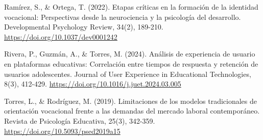 Ramírez, S., \& Ortega, T. (2022). Etapas críticas en la formación de la identidad vocacional: Perspectivas desde la neurociencia y la psicología del desarrollo. Developmental Psychology Review, 34(2), 189-210. \url{https://doi.org/10.1037/dev0001242}
\newline

Rivera, P., Guzmán, A., \& Torres, M. (2024). Análisis de experiencia de usuario en plataformas educativas: Correlación entre tiempos de respuesta y retención de usuarios adolescentes. Journal of User Experience in Educational Technologies, 8(3), 412-429. \url{https://doi.org/10.1016/j.juet.2024.03.005}
\newline

Torres, L., \& Rodríguez, M. (2019). Limitaciones de los modelos tradicionales de orientación vocacional frente a las demandas del mercado laboral contemporáneo. Revista de Psicología Educativa, 25(3), 342-359. \url{https://doi.org/10.5093/psed2019a15}